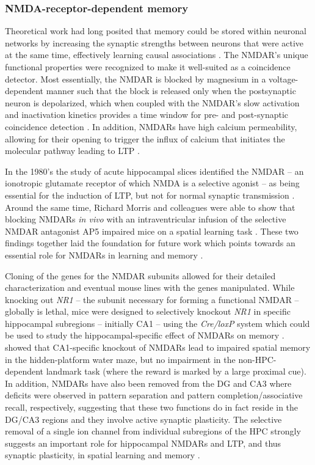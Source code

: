 \subsubsection{NMDA-receptor-dependent memory}
\label{sec:intro:memory:NMDAR}
Theoretical work had long posited that memory could be stored within neuronal networks by increasing the synaptic strengths between neurons that were active at the same time, effectively learning causal associations \citep{Hebb1949, Marr1971}.
The \ac{NMDAR}'s unique functional properties were recognized to make it well-suited as a coincidence detector.
Most essentially, the \ac{NMDAR} is blocked by magnesium in a voltage-dependent manner such that the block is released only when the postsynaptic neuron is depolarized, which when coupled with the \ac{NMDAR}'s slow activation and inactivation kinetics provides a time window for pre- and post-synaptic coincidence detection \citep[reviewed in][]{Bliss1993}.
In addition, \acp{NMDAR} have high calcium permeability, allowing for their opening to trigger the influx of calcium that initiates the molecular pathway leading to \ac{LTP} \citep{Bailey2008}.

In the 1980's the study of acute hippocampal slices identified the \ac{NMDAR} -- an ionotropic glutamate receptor of which \ac{NMDA} is a selective agonist -- as being essential for the induction of \ac{LTP}, but not for normal synaptic transmission \citep{Collingridge1983}.
Around the same time, Richard Morris and colleagues were able to show that blocking \acp{NMDAR} \emph{in vivo} with an intraventricular infusion of the selective \ac{NMDAR} antagonist \ac{AP5} impaired mice on a spatial learning task \citep{Morris1986}.
These two findings together laid the foundation for future work which points towards an essential role for \acp{NMDAR} in learning and memory \citep{Morris2013}.

Cloning of the genes for the \ac{NMDAR} subunits \citep{Moriyoshi1991} allowed for their detailed characterization and eventual mouse lines with the genes manipulated.
While knocking out \emph{NR1} -- the subunit necessary for forming a functional \ac{NMDAR} -- globally is lethal, mice were designed to selectively knockout \emph{NR1} in specific hippocampal subregions -- initially CA1 -- using the \emph{Cre/loxP} system which could be used to study the hippocampal-specific effect of \acp{NMDAR} on memory \citep{Tsien1996}.
\citeauthor{Tsien1996} showed that CA1-specific knockout of \acp{NMDAR} lead to impaired spatial memory in the hidden-platform water maze, but no impairment in the non-\acs{HPC}-dependent landmark task (where the reward is marked by a large proximal cue).
In addition, \acp{NMDAR} have also been removed from the \ac{DG} \citep{McHugh2007} and CA3 \citep{Nakazawa2002} where deficits were observed in pattern separation and pattern completion/associative recall, respectively, suggesting that these two functions do in fact reside in the DG/CA3 regions and they involve active synaptic plasticity.
The selective removal of a single ion channel from individual subregions of the \ac{HPC} strongly suggests an important role for hippocampal \acp{NMDAR} and \ac{LTP}, and thus synaptic plasticity, in spatial learning and memory \citep{Tsien1996}.

